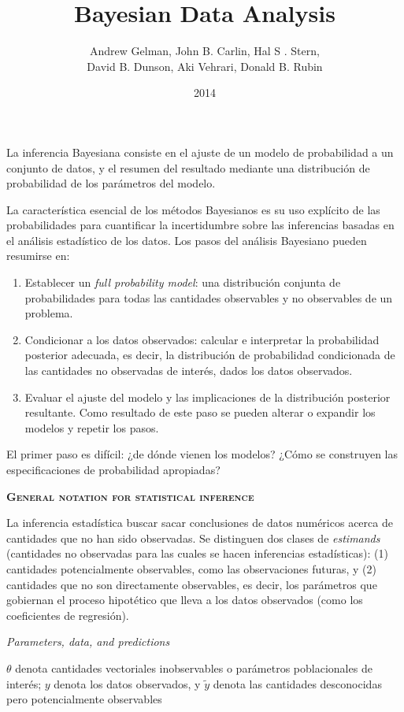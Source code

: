 \documentclass[a4paper,12pt]{article}
\title{Bayesian Data Analysis}
\author{Andrew Gelman, John B. Carlin, Hal S . Stern,\\David B. Dunson, Aki Vehrari, Donald B. Rubin}
\date{2014}
\begin{document}
{\scshape\bfseries \maketitle}

La inferencia Bayesiana consiste en el ajuste de un modelo de probabilidad a un conjunto de datos, y el resumen del resultado mediante una distribución de probabilidad de los parámetros del modelo.

La característica esencial de los métodos Bayesianos es su uso explícito de las probabilidades para cuantificar la incertidumbre sobre las inferencias basadas en el análisis estadístico de los datos. Los pasos del análisis Bayesiano pueden resumirse en:
\begin{enumerate}
	\item Establecer un {\itshape full probability model}: una distribución conjunta de probabilidades para todas las cantidades observables y no observables de un problema.
	\item Condicionar a los datos observados: calcular e interpretar la probabilidad posterior adecuada, es decir, la distribución de probabilidad condicionada de las cantidades no observadas de interés, dados los datos observados.
	\item Evaluar el ajuste del modelo y las implicaciones de la distribución posterior resultante. Como resultado de este paso se pueden alterar o expandir los modelos y repetir los pasos.
\end{enumerate}

El primer paso es difícil: ¿de dónde vienen los modelos? ¿Cómo se construyen las especificaciones de probabilidad apropiadas?

{\scshape\bfseries General notation for statistical inference}

La inferencia estadística buscar sacar conclusiones de datos numéricos acerca de cantidades que no han sido observadas. Se distinguen dos clases de {\itshape estimands} (cantidades no observadas para las cuales se hacen inferencias estadísticas): (1) cantidades potencialmente observables, como las observaciones futuras, y (2) cantidades que no son directamente observables, es decir, los parámetros que gobiernan el proceso hipotético que lleva a los datos observados (como los coeficientes de regresión). 

{\itshape Parameters, data, and predictions}

$\theta$ denota cantidades vectoriales inobservables o parámetros poblacionales de interés; $y$ denota los datos observados, y $\tilde{y}$ denota las cantidades desconocidas pero potencialmente observables 
\end{document}
